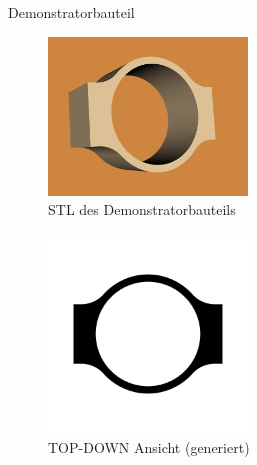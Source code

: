 \documentclass[../slides.tex]{subfiles}
\begin{document}
\begin{frame}{Demonstratorbauteil}
  \begin{minipage}[h]{.49\textwidth}
    \begin{figure}[]
      \includegraphics[width=150pt]{img_niklas/base_image.png}
      \caption[short]{STL des Demonstratorbauteils}
    \end{figure}
  \end{minipage}
  \hfill
  \begin{minipage}[h]{.49\textwidth}
    \begin{figure}[]
      \includegraphics[width=150pt]{img_niklas/base_top_down.png}
      \caption[short]{TOP-DOWN Ansicht (generiert)}
    \end{figure}
  \end{minipage}
\end{frame}
\end{document}
